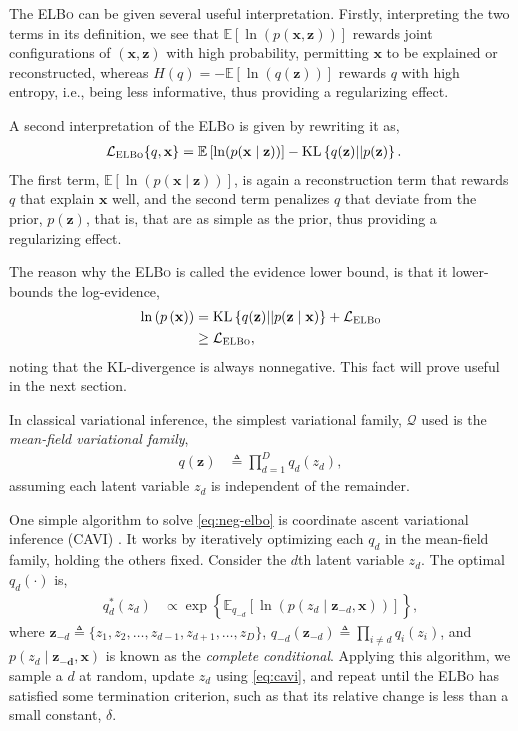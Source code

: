 The {\scshape ELBo} can be given several useful interpretation. Firstly, interpreting the two terms in its definition, we see that $\mathbb{E}\left[\ln(p(\mathbf{x},\mathbf{z}))\right]$ rewards joint configurations of $(\mathbf{x},\mathbf{z})$ with high probability, permitting $\mathbf{x}$ to be explained or reconstructed, whereas $H(q)=-\mathbb{E}\left[\ln(q(\mathbf{z}))\right]$ rewards $q$ with high entropy, i.e., being less informative, thus providing a regularizing effect.

A second interpretation of the {\scshape ELBo} is given by rewriting it as,
\begin{align*}
	\mathcal{L}_{\text{\scshape ELBo}}\{q,\mathbf{x}\} &= \mathbb{E}\left[\ln(p(\mathbf{x}\mid\mathbf{z}))\right] - \text{KL}\left\{q(\mathbf{z})||p(\mathbf{z})\right\}.
\end{align*}
The first term, $\mathbb{E}\left[\ln(p(\mathbf{x}\mid\mathbf{z}))\right]$, is again a reconstruction term that rewards $q$ that explain $\mathbf{x}$ well, and the second term penalizes $q$ that deviate from the prior, $p(\mathbf{z})$, that is, that are as simple as the prior, thus providing a regularizing effect.

The reason why the {\scshape ELBo} is called the evidence lower bound, is that it lower-bounds the log-evidence,
\begin{align*}
	\ln\left(p\left(\mathbf{x}\right)\right) &= \text{KL}\left\{q(\mathbf{z})||p(\mathbf{z}\mid\mathbf{x})\right\} + \mathcal{L}_{\text{\scshape ELBo}}\\
	&\ge \mathcal{L}_{\text{\scshape ELBo}},
\end{align*}
noting that the KL-divergence is always nonnegative. This fact will prove useful in the next section.

In classical variational inference, the simplest variational family, $\mathcal{Q}$ used is the \emph{mean-field variational family},
\begin{align*}
	q(\mathbf{z}) &\triangleq \prod^D_{d=1}q_d(z_d),
\end{align*} 
assuming each latent variable $z_d$ is independent of the remainder.

One simple algorithm to solve \eqref{eq:neg-elbo} is coordinate ascent variational inference (CAVI) \citep{BleiEtAl2016}. It works by iteratively optimizing each $q_d$ in the mean-field family, holding the others fixed. Consider the $d$th latent variable $z_d$. The optimal $q_d(\cdot)$ is,
\begin{align}\label{eq:cavi}
	q^*_d(z_d) &\propto \exp\left\{\mathbb{E}_{q_{-d}}\left[\ln\left(p(z_d\mid\mathbf{z}_{-d},\mathbf{x})\right)\right]\right\},
\end{align}
where $\mathbf{z}_{-d}\triangleq\{z_1,z_2,\ldots,z_{d-1},z_{d+1},\ldots,z_D\}$, $q_{-d}(\mathbf{z}_{-d})\triangleq\prod_{i\neq d}q_i(z_i)$, and $p(z_d\mid\mathbf{z_{-d}},\mathbf{x})$ is known as the \emph{complete conditional}. Applying this algorithm, we sample a $d$ at random, update $z_d$ using \eqref{eq:cavi}, and repeat until the {\scshape ELBo} has satisfied some termination criterion, such as that its relative change is less than a small constant, $\delta$.

